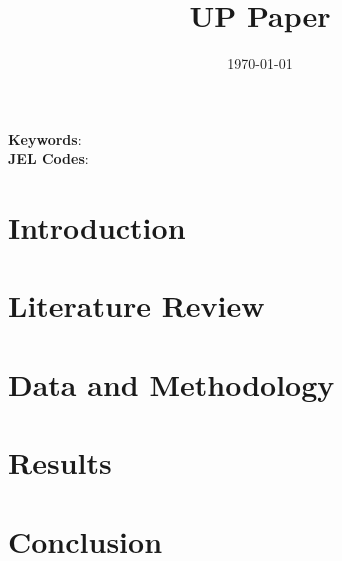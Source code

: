 \documentclass[
  letterpaper,
  DIV=11,
  numbers=noendperiod]{scrartcl}
\author{}
\date{}
\begin{document}
\title{UP Paper}



\date{\today}
\maketitle

\begin{abstract}


\end{abstract}

\noindent\textbf{Keywords}:    \\
\textbf{JEL Codes}: 
\newpage

\ifdefined\Shaded\renewenvironment{Shaded}{\begin{tcolorbox}[breakable, boxrule=0pt, interior hidden, borderline west={3pt}{0pt}{shadecolor}, sharp corners, frame hidden, enhanced]}{\end{tcolorbox}}\fi

\hypertarget{introduction}{%
\section{Introduction}\label{introduction}}

\hypertarget{literature-review}{%
\section{Literature Review}\label{literature-review}}

\citet{alexakis2023animal}

\hypertarget{data-and-methodology}{%
\section{Data and Methodology}\label{data-and-methodology}}

\newpage

\hypertarget{results}{%
\section{Results}\label{results}}

\hypertarget{conclusion}{%
\section{Conclusion}\label{conclusion}}
\end{document}
